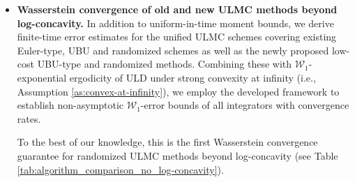 \documentclass[12pt]{article}
\numberwithin{equation}{section}
\begin{document}
\begin{itemize}
     \item  \textbf{Wasserstein convergence of old and new ULMC methods beyond log-concavity.} 
     In addition to uniform-in-time moment bounds, we derive finite-time error estimates for the unified ULMC schemes covering existing Euler-type, UBU and randomized schemes as well as the newly proposed low-cost UBU-type and randomized methods. Combining these with \(\mathcal W_1\)-exponential ergodicity of ULD under strong convexity at infinity (i.e., Assumption \ref{as:convex-at-infinity}), we employ the developed framework to establish non-asymptotic \(\mathcal W_1\)-error bounds of all integrators with convergence rates.

%
To the best of our knowledge, this is the first Wasserstein convergence guarantee for randomized ULMC methods beyond log-concavity (see Table \ref{tab:algorithm_comparison_no_log-concavity}).

\end{itemize}


\end{document}
